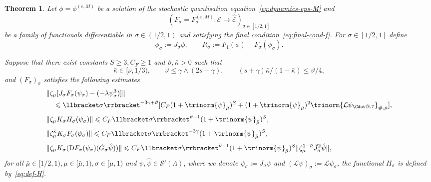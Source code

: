 \documentclass{article}
\makeatletter
\numberwithin{equation}{section}
\newcommand{\assign}{:=}
\newcommand{\mathD}{\mathrm{D}}
\newcommand*\Cdot{{\mathpalette\Cdot@{.7}}}
\newcommand*\Cdot@[2]{\mathbin{\vcenter{\hbox{\scalebox{#2}{\hspace{0.1mm}$\m@th#1\bullet$\hspace{0.1mm}}}}}}
\theoremstyle{plain}
\newtheorem{theorem}{Theorem}[section]
\theoremstyle{definition}
\makeatother
\begin{document}
\begin{theorem}
  \label{thm:apriori-system}Let $\phi = \phi^{(\varepsilon,
  M)}$ be a solution of the stochastic quantisation
  equation~\eqref{eq:dynamics-eps-M} and
  \[ \left( F_{\sigma} {= F_{\sigma}^{(\varepsilon, M)}}  : \mathcal{E}
     \rightarrow \hat{\mathcal{E}} \right)_{\sigma \in [1 / 2, 1]} \]
  be a family of functionals differentiable in $\sigma \in (1 / 2, 1)$ and
  satisfying the final condition~\eqref{eq:final-cond-f}. For $\sigma \in [1 /
  2, 1]$ define
  \[ \phi_{\sigma} \assign J_{\sigma} \phi, \qquad R_{\sigma} \assign F_1 (\phi)
     - F_{\sigma} (\phi_{\sigma}) . \]
  
  Suppose that there exist constants $S\geqslant 3, C_F \geqslant 1$ and
  $\vartheta, \bar{\kappa} > 0$ such that
  \begin{equation}
    \bar{\kappa} \in [\nu, 1/3), \qquad \vartheta \leqslant \gamma \wedge (2 s -
    \gamma), \qquad (s + \gamma)  \bar{\kappa} / (1 - \bar{\kappa}) \leqslant
    \vartheta / 4, \label{eq:thm-constraints}
  \end{equation}
  and $(F_{\sigma})_{\sigma}$ satisfies the following estimates
  \begin{equation}
    \begin{aligned}
      &\| \zeta_{\mu} [J_{\sigma} F_{\sigma} (\psi_{\sigma})
      - (- \lambda \psi_{\sigma}^3)] \|\\
      &\quad \leqslant \llbracket \sigma \rrbracket^{- 3 \gamma + \vartheta}
      [C_F  (1 + \trinorm{ \psi }_{\bar{\mu}})^S
      + (1 + \trinorm{ \psi }_{\bar{\mu}})^2
      \trinorm{ \mathcal{L} \psi_{\Cdot} }_{\#, \bar{\mu}}],\\[3pt]
      &\| \zeta_{\mu} K_{\sigma} H_{\sigma} (\psi_{\sigma}) \|
      \leqslant
      C_F  \llbracket \sigma \rrbracket^{\vartheta - 1}
      (1 + \trinorm{ \psi }_{\bar{\mu}})^S,\\[3pt]
      &\| \zeta^{\bar{\kappa}}_{\mu} K_{\sigma}
      F_{\sigma} (\psi_{\sigma}) \|
      \leqslant C_F  \llbracket \sigma \rrbracket^{- 3 \gamma}
      (1 + \trinorm{ \psi }_{\bar{\mu}})^S,\\[3pt]
      &\| \zeta_{\mu} K_{\sigma}
      (\mathD F_{\sigma} (\psi_{\sigma})
      (\dot{G}_{\sigma}  \hat{\psi})) \| \leqslant C_F  \llbracket \sigma \rrbracket^{\vartheta - 1}
      (1 + \trinorm{ \psi }_{\bar{\mu}})^S
      \| \zeta^{1 - \bar{\kappa}}_{\mu}
      \tilde{J}_{\sigma}^2 \hat{\psi} \|,
    \end{aligned} \label{eq:est-F}
  \end{equation}
  for all $\bar{\mu} \in [1 / 2, 1), \mu \in [\bar{\mu}, 1), \sigma \in [\mu,
  1)$ and $\psi, \hat{\psi} \in \mathcal{S}' (\Lambda)$, where we denote
  $\psi_{\sigma} \assign J_{\sigma} \psi$ and $(\mathcal{L} \psi)_{\sigma}
  \assign \mathcal{L} \psi_{\sigma}$, the functional $H_\sigma$ is defined
  by~\eqref{eq:def-H}.
  

\end{theorem}
\end{document}
